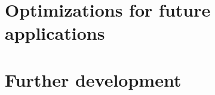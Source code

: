 
\section{Optimizations for future applications}

\iffalse
\subsection{Employing ultra-wide Fish-eye lenses}
Increased percieved FOV \\
Decouple from camera FPS\\

\subsection{Low FPS: decreasing image resolution}

\subsection{Undistort and marker detection in CUDA}

\subsection{"Mono" mode}

\subsection{Virtual nose}
\fi

\section{Further development}

\iffalse
\subsection{Depth mapping with CUDA, stereo computer vision or depth sensor}

\subsection{Enhancing interactions with virtual hands with Leap Motion}

\subsection{Integration with ROS}
\fi